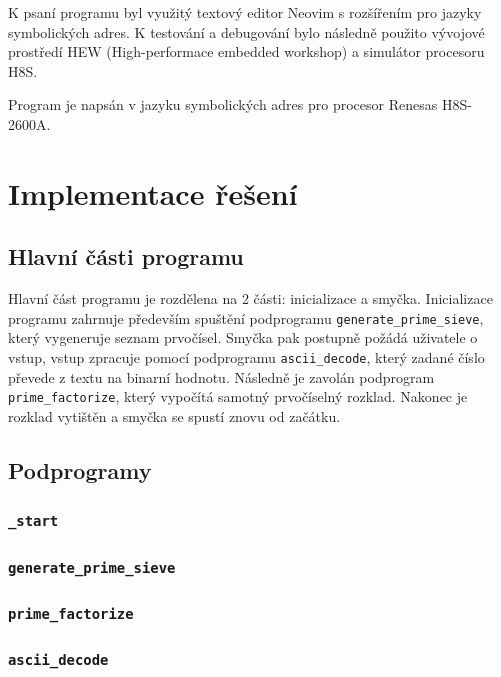 \documentclass[12pt]{article}
\newcommand{\code}[1]{\colorbox{light-gray}{\mbox{\texttt{#1}}}}
\begin{document}
K psaní programu byl využitý textový editor Neovim s rozšířením pro jazyky symbolických
adres. K testování a debugování bylo následně použito vývojové prostředí HEW (High-performace
embedded workshop) a simulátor procesoru H8S.

Program je napsán v jazyku symbolických adres pro procesor Renesas H8S-2600A.

\section{Implementace řešení}

\subsection{Hlavní části programu}

Hlavní část programu je rozdělena na 2 části: inicializace a smyčka. Inicializace programu
zahrnuje především spuštění podprogramu \code{generate\_prime\_sieve}, který vygeneruje seznam 
prvočísel. Smyčka pak postupně požádá uživatele o vstup, vstup zpracuje pomocí podprogramu 
\code{ascii\_decode}, který zadané číslo převede z textu na binarní hodnotu. Následně je zavolán
podprogram \code{prime\_factorize}, který vypočítá samotný prvočíselný rozklad. Nakonec je
rozklad vytištěn a smyčka se spustí znovu od začátku.

\subsection{Podprogramy}

\subsubsection{\code{\_start}}

\subsubsection{\code{generate\_prime\_sieve}}

\subsubsection{\code{prime\_factorize}}

\subsubsection{\code{ascii\_decode}}
\end{document}
